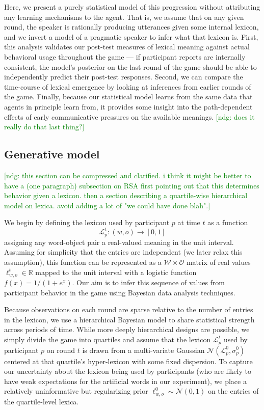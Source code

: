 \documentclass[10pt,letterpaper]{article}
\newcommand{\ndg}[1]{\textcolor{Green}{[ndg: #1]}}
\begin{document}
Here, we present a purely statistical model of this progression without attributing any learning mechanisms to the agent. That is, we assume that on any given round, the speaker is rationally producing utterances given some internal lexicon, and we invert a model of a pragmatic speaker to infer what that lexicon is. First, this analysis validates our post-test measures of lexical meaning against actual behavioral usage throughout the game --- if participant reports are internally consistent, the model's posterior on the last round of the game should be able to independently predict their post-test responses. Second, we can compare the time-course of lexical emergence by looking at inferences from earlier rounds of the game. Finally, because our statistical model learns from the same data that agents in principle learn from, it provides some insight into the path-dependent effects of early communicative pressures on the available meanings. %
\ndg{does it really do that last thing?}

\subsection{Generative model}

\ndg{this section can be compressed and clarified. i think it might be better to have a (one paragraph) subsection on RSA first pointing out that this determines behavior given a lexicon. then a section describing a quartile-wise hierarchical model on lexica. avoid adding a lot of "we could have done blah".}

We begin by defining the lexicon used by participant $p$ at time $t$ as a function 
$$\mathcal{L}_p^{t} : (w, o) \rightarrow [0,1]$$ 
assigning any word-object pair a real-valued meaning in the unit interval. Assuming for simplicity that the entries are independent (we later relax this assumption), this function can be represented as a $\mathcal{W} \times \mathcal{O}$ matrix of real values $\ell_{w,o}^t \in \mathbb{R}$ mapped to the unit interval with a logistic function $f(x) = 1/(1 + e^{x})$. Our aim is to infer this sequence of values from participant behavior in the game using Bayesian data analysis techniques. 

Because observations on each round are sparse relative to the number of entries in the lexicon, we use a hierarchical Bayesian model to share statistical strength across periods of time. While more deeply hierarchical designs are possible, we simply divide the game into quartiles and assume that the lexicon $\mathcal{L}^t_p$ used by participant $p$ on round $t$ is drawn from a multi-variate Gaussian $\mathcal{N}(\mathcal{L}^{0}_p, \sigma_p^{0})$ centered at that quartile's hyper-lexicon with some fixed dispersion. To capture our uncertainty about the lexicon being used by participants (who are likely to have weak expectations for the artificial words in our experiment), we place a relatively uninformative but regularizing prior $\ell_{w,o}^0 \sim \mathcal{N}(0, 1)$ on the entries of the quartile-level lexica. 
\end{document}
